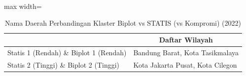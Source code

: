 \begin{table}[H]
\centering
\caption{Nama Daerah Perbandingan Klaster Biplot vs STATIS (vs Kompromi) (2022)} \label{tab:sample2biplot_statis_name_2022}
\begin{adjustbox}{max width=\textwidth}
\begin{tabular}{|>{\centering\arraybackslash}p{4cm}|p{10cm}|}
\hline
\multicolumn{1}{|c|}{\textbf{Kategori}} & \multicolumn{1}{c|}{\textbf{Daftar Wilayah}} \\
\hline
Statis 1 (Rendah) \& Biplot 1 (Rendah) & Bandung Barat, Kota Tasikmalaya \\
\hline
Statis 2 (Tinggi) \& Biplot 2 (Tinggi) & Kota Jakarta Pusat, Kota Cilegon \\
\hline
\end{tabular}
\end{adjustbox}
\end{table}